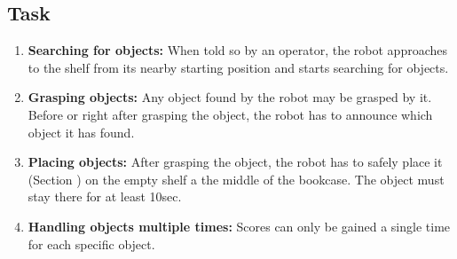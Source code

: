 \subsection{Task}
\begin{enumerate}
\item \textbf{Searching for objects:} When told so by an operator, the robot approaches to the shelf from its nearby starting position and starts searching for objects.
\item \textbf{Grasping objects:} Any object found by the robot may be grasped by it. Before or right after grasping the object, the robot has to announce which object it has found.
\item \textbf{Placing objects:} After grasping the object, the robot has to safely place it (Section ) on the empty shelf a the middle of the bookcase. 
  The object must stay there for at least 10sec.
\item \textbf{Handling objects multiple times:} Scores can only be gained a single time for each specific object.
\end{enumerate}

